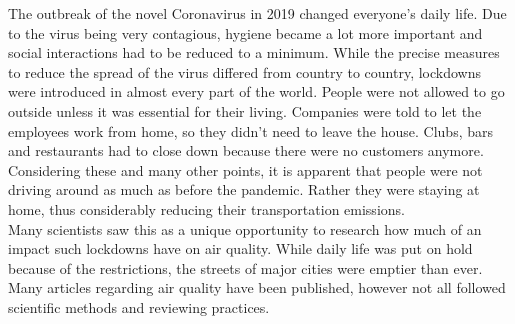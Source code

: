 The outbreak of the novel Coronavirus in 2019 changed everyone's daily life. Due to the virus being very contagious, hygiene became a lot more important and social interactions had to be reduced to a minimum. While the precise measures to reduce the spread of the virus differed from country to country, lockdowns were introduced in almost every part of the world. People were not allowed to go outside unless it was essential for their living. Companies were told to let the employees work from home, so they didn't need to leave the house. Clubs, bars and restaurants had to close down because there were no customers anymore. Considering these and many other points, it is apparent that people were not driving around as much as before the pandemic. Rather they were staying at home, thus considerably reducing their transportation emissions. \\
Many scientists saw this as a unique opportunity to research how much of an impact such lockdowns have on air quality. While daily life was put on hold because of the restrictions, the streets of major cities were emptier than ever. Many articles regarding air quality have been published, however not all followed scientific methods and reviewing practices.





